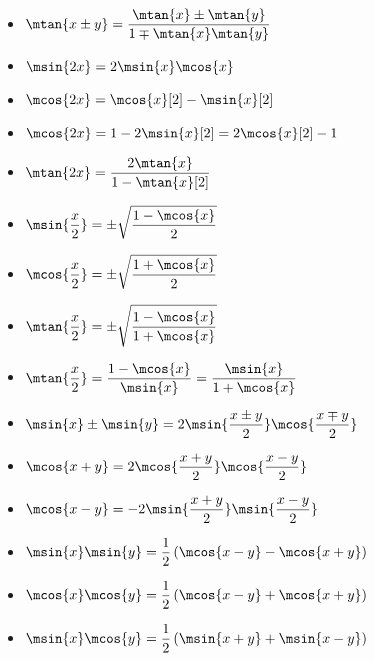 \begin{itemize}
	\item $\ds\mtan{x\pm y} =\dfrac{\mtan{x}\pm\mtan{y}}{1\mp\mtan{x}\mtan{y}}$
	\item $\ds\msin{2x} =2\msin{x}\mcos{x}$
	\item $\ds\mcos{2x} =\mcos{x}[2] -\msin{x}[2]$
	\item $\ds\mcos{2x} = 1 - 2\msin{x}[2] = 2\mcos{x}[2] - 1$
	\item $\ds\mtan{2x} =\dfrac{2\mtan{x}}{1 -\mtan{x}[2]}$
	\item $\ds\msin{\dfrac{x}{2}} =\pm\sqrt{\dfrac{1 -\mcos{x}}{2}}$
	\item $\ds\mcos{\dfrac{x}{2}} =\pm\sqrt{\dfrac{1 +\mcos{x}}{2}}$
	\item $\ds\mtan{\dfrac{x}{2}} =\pm\sqrt{\dfrac{1 - \mcos{x}}{1 +\mcos{x}}}$
	\item $\ds\mtan{\dfrac{x}{2}} =\dfrac{1 -\mcos{x}}{\msin{x}} =\dfrac{\msin{x}}{1 +\mcos{x}}$
	\item $\ds\msin{x}\pm\msin{y} =2\msin{\dfrac{x\pm y}{2}}\mcos{\dfrac{x\mp y}{2}}$
	\item $\ds\mcos{x + y} = 2\mcos{\dfrac{x + y}{2}}\mcos{\dfrac{x - y}{2}}$
	\item $\ds\mcos{x - y} = -2\msin{\dfrac{x + y}{2}}\msin{\dfrac{x - y}{2}}$
	\item $\ds\msin{x}\msin{y} =\dfrac{1}{2}\pa{\mcos{x - y} -\mcos{x + y}}$
	\item $\ds\mcos{x}\mcos{y} =\dfrac{1}{2}\pa{\mcos{x - y} +\mcos{x + y}}$
	\item $\ds\msin{x}\mcos{y} =\dfrac{1}{2}\pa{\msin{x + y} +\msin{x - y}}$
\end{itemize}